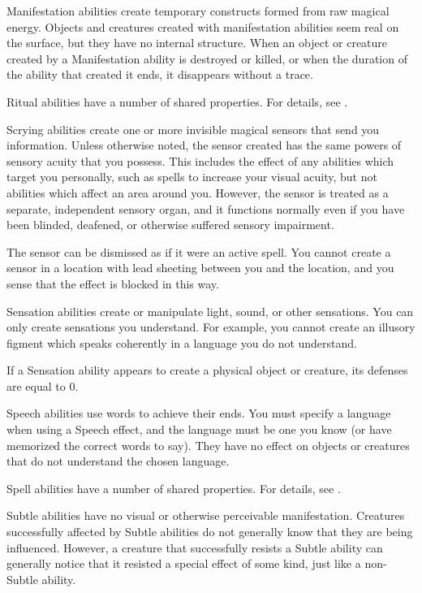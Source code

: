      Manifestation abilities create temporary constructs formed from raw magical energy.
    Objects and creatures created with manifestation abilities seem real on the surface, but they have no internal structure.
    When an object or creature created by a Manifestation ability is destroyed or killed, or when the duration of the ability that created it ends, it disappears without a trace.

     Ritual abilities have a number of shared properties.
    For details, see .

     Scrying abilities create one or more invisible magical sensors that send you information.
    Unless otherwise noted, the sensor created has the same powers of sensory acuity that you possess.
    This includes the effect of any abilities which target you personally, such as spells to increase your visual acuity, but not abilities which affect an area around you.
    However, the sensor is treated as a separate, independent sensory organ, and it functions normally even if you have been blinded, deafened, or otherwise suffered sensory impairment.
    \par The sensor can be dismissed as if it were an active spell.
    You cannot create a sensor in a location with lead sheeting between you and the location, and you sense that the effect is blocked in this way.

     Sensation abilities create or manipulate light, sound, or other sensations.
    You can only create sensations you understand.
    For example, you cannot create an illusory figment which speaks coherently in a language you do not understand.
    \par If a Sensation ability appears to create a physical object or creature, its defenses are equal to 0.

     Speech abilities use words to achieve their ends.
    You must specify a language when using a Speech effect, and the language must be one you know (or have memorized the correct words to say). They have no effect on objects or creatures that do not understand the chosen language.

     Spell abilities have a number of shared properties.
    For details, see .

     Subtle abilities have no visual or otherwise perceivable manifestation.
    Creatures successfully affected by Subtle abilities do not generally know that they are being influenced.
    However, a creature that successfully resists a Subtle ability can generally notice that it resisted a special effect of some kind, just like a non-Subtle ability.

